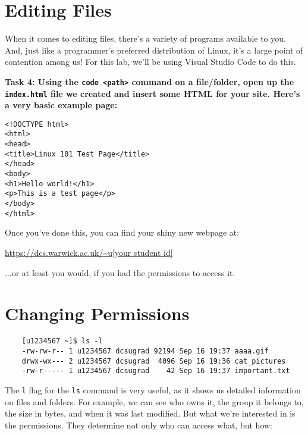 \documentclass[a4paper,11pt,parskip=half-]{scrartcl}
\begin{document}
\section*{Editing Files}

When it comes to editing files, there's a variety of programs available to you. 
And, just like a programmer's preferred distribution of Linux, it's a large point of contention among us! 
For this lab, we'll be using Visual Studio Code to do this.

\bfseries Task 4: \normalfont 
Using the \texttt{code <path>} command on a file/folder, open up the \texttt{index.html} file we created and insert some HTML for your site. 
Here's a very basic example page:

\qquad \texttt{<!DOCTYPE html>} \\
\qquad \texttt{<html>} \\
\qquad \qquad \texttt{<head>} \\
\qquad \qquad \qquad \texttt{<title>Linux 101 Test Page</title>} \\
\qquad \qquad \texttt{</head>} \\
\qquad \qquad \texttt{<body>} \\
\qquad \qquad \qquad \texttt{<h1>Hello world!</h1>} \\
\qquad \qquad \qquad \texttt{<p>This is a test page</p>} \\
\qquad \qquad \texttt{</body>} \\
\qquad \texttt{</html>}

Once you've done this, you can find your shiny new webpage at:

\qquad \url{https://dcs.warwick.ac.uk/~u[your student id]}

...or at least you would, if you had the permissions to access it.

\section*{Changing Permissions}

\begin{verbatim}
    [u1234567 ~]$ ls -l
    -rw-rw-r-- 1 u1234567 dcsugrad 92194 Sep 16 19:37 aaaa.gif
    drwx-wx--- 2 u1234567 dcsugrad  4096 Sep 16 19:36 cat_pictures
    -rw-r----- 1 u1234567 dcsugrad    42 Sep 16 19:37 important.txt
\end{verbatim}

The \texttt{l} flag for the \texttt{ls} command is very useful, as it shows us detailed information on files and folders. 
For example, we can see who owns it, the group it belongs to, the size in bytes, and when it was last modified. 
But what we're interested in is the permissions. 
They determine not only who can access what, but how:
\end{document}

